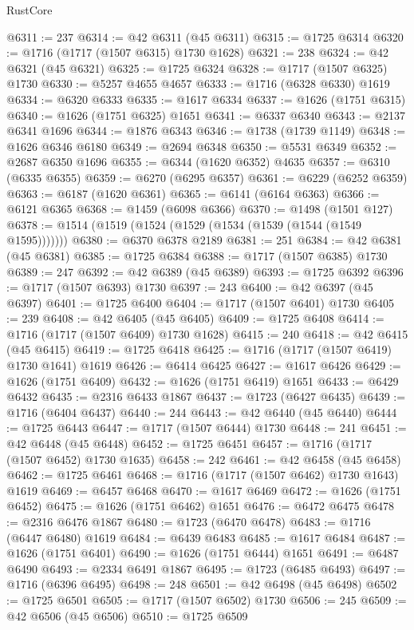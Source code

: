 \begin{lexlean}{RustCore}
\begin{coremodule}
@6311 := 237
@6314 := @42 @6311 (@45 @6311)
@6315 := @1725 @6314
@6320 := @1716 (@1717 (@1507 @6315) @1730 @1628)
@6321 := 238
@6324 := @42 @6321 (@45 @6321)
@6325 := @1725 @6324
@6328 := @1717 (@1507 @6325) @1730
@6330 := @5257 @4655 @4657
@6333 := @1716 (@6328 @6330) @1619
@6334 := @6320 @6333
@6335 := @1617 @6334
@6337 := @1626 (@1751 @6315)
@6340 := @1626 (@1751 @6325) @1651
@6341 := @6337 @6340
@6343 := @2137 @6341 @1696
@6344 := @1876 @6343
@6346 := @1738 (@1739 @1149)
@6348 := @1626 @6346 @6180
@6349 := @2694 @6348
@6350 := @5531 @6349
@6352 := @2687 @6350 @1696
@6355 := @6344 (@1620 @6352) @4635
@6357 := @6310 (@6335 @6355)
@6359 := @6270 (@6295 @6357)
@6361 := @6229 (@6252 @6359)
@6363 := @6187 (@1620 @6361)
@6365 := @6141 (@6164 @6363)
@6366 := @6121 @6365
@6368 := @1459 (@6098 @6366)
@6370 := @1498 (@1501 @127)
@6378 := @1514 (@1519 (@1524 (@1529 (@1534 (@1539 (@1544 (@1549 @1595)))))))
@6380 := @6370 @6378 @2189
@6381 := 251
@6384 := @42 @6381 (@45 @6381)
@6385 := @1725 @6384
@6388 := @1717 (@1507 @6385) @1730
@6389 := 247
@6392 := @42 @6389 (@45 @6389)
@6393 := @1725 @6392
@6396 := @1717 (@1507 @6393) @1730
@6397 := 243
@6400 := @42 @6397 (@45 @6397)
@6401 := @1725 @6400
@6404 := @1717 (@1507 @6401) @1730
@6405 := 239
@6408 := @42 @6405 (@45 @6405)
@6409 := @1725 @6408
@6414 := @1716 (@1717 (@1507 @6409) @1730 @1628)
@6415 := 240
@6418 := @42 @6415 (@45 @6415)
@6419 := @1725 @6418
@6425 := @1716 (@1717 (@1507 @6419) @1730 @1641) @1619
@6426 := @6414 @6425
@6427 := @1617 @6426
@6429 := @1626 (@1751 @6409)
@6432 := @1626 (@1751 @6419) @1651
@6433 := @6429 @6432
@6435 := @2316 @6433 @1867
@6437 := @1723 (@6427 @6435)
@6439 := @1716 (@6404 @6437)
@6440 := 244
@6443 := @42 @6440 (@45 @6440)
@6444 := @1725 @6443
@6447 := @1717 (@1507 @6444) @1730
@6448 := 241
@6451 := @42 @6448 (@45 @6448)
@6452 := @1725 @6451
@6457 := @1716 (@1717 (@1507 @6452) @1730 @1635)
@6458 := 242
@6461 := @42 @6458 (@45 @6458)
@6462 := @1725 @6461
@6468 := @1716 (@1717 (@1507 @6462) @1730 @1643) @1619
@6469 := @6457 @6468
@6470 := @1617 @6469
@6472 := @1626 (@1751 @6452)
@6475 := @1626 (@1751 @6462) @1651
@6476 := @6472 @6475
@6478 := @2316 @6476 @1867
@6480 := @1723 (@6470 @6478)
@6483 := @1716 (@6447 @6480) @1619
@6484 := @6439 @6483
@6485 := @1617 @6484
@6487 := @1626 (@1751 @6401)
@6490 := @1626 (@1751 @6444) @1651
@6491 := @6487 @6490
@6493 := @2334 @6491 @1867
@6495 := @1723 (@6485 @6493)
@6497 := @1716 (@6396 @6495)
@6498 := 248
@6501 := @42 @6498 (@45 @6498)
@6502 := @1725 @6501
@6505 := @1717 (@1507 @6502) @1730
@6506 := 245
@6509 := @42 @6506 (@45 @6506)
@6510 := @1725 @6509

\end{coremodule}
\end{lexlean}
